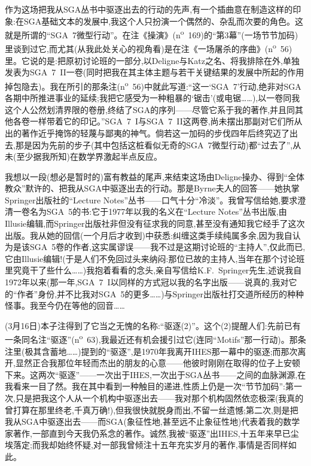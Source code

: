作为这场把我从SGA丛书中驱逐出去的行动的先声,有一个插曲意在制造这样的印象:在SGA基础文本的发展中,我这个人只扮演一个偶然的、杂乱而次要的角色。这就是所谓的“SGA~7微型行动”。在注《操演》(n\textsuperscript{o}~169)的“第3幕”(一场节节加码)里谈到过它,而尤其(从我此处关心的视角看)是在注《一场屠杀的序曲》(n\textsuperscript{o}~56)里。它说的是:把原初讨论班的一部分,以Deligne与Katz之名、将我排除在外,单独发表为SGA~7~II一卷(同时把我在其主体主题与若干关键结果的发展中所起的作用掉包隐去)。我在所引的那条注(n\textsuperscript{o}~56)中就此写道:“这一‘SGA~7’行动,绝非对SGA各期中所推进事业的延续;我把它感受为一种粗暴的‘锯击’(或电锯……),以一卷同我这个人公然划清界限的卷册,终结了SGA的序列——尽管它系于我的著作,并且同其他各卷一样带着它的印记。”SGA~7~I与SGA~7~II这两卷,尚未摆出那副对它们所从出的著作近乎掩饰的轻蔑与鄙夷的神气。倘若这一加码的步伐四年后终究迈了出去,那是因为先前的步子(其中包括这桩看似无奇的SGA~7微型行动)都“过去了”,从未(至少据我所知)在数学界激起半点反应。

我想以一段(想必是暂时的)富有教益的尾声,来结束这场由Deligne操办、得到“全体教众”默许的、把我从SGA中驱逐出去的行动。那是Byrne夫人的回答——她执掌Springer出版社的“Lecture Notes”丛书——口气十分“冷淡”。我曾写信给她,要求澄清一卷名为SGA~5的书:它于1977年以我的名义在“Lecture Notes”丛书出版,由Illusie编辑,而Springer出版社非但没有征求我的同意,甚至没有通知我它经手了这次出版。我从她的回信(一个月后才收到)中获悉:纠缠这类手续纯属多余,因为我自认为是该SGA~5卷的作者,这实属谬误——我不过是这期讨论班的“主持人”,仅此而已,它由Illusie编辑!(于是人们不免回过头来纳闷:那位已故的主持人,当年在那个讨论班里究竟干了些什么……)我抱着看看的念头,亲自写信给K.F.~Springer先生,述说我自1972年以来(那一年,SGA~7~I以同样的方式冠以我的名字出版——说真的,我对它的“作者”身份,并不比我对SGA~5的更多……)与Springer出版社打交道所经历的种种怪事。我至今仍在等他的回音……

(3月16日)本子注得到了它当之无愧的名称:“驱逐(2)”。这个(2)提醒人们:先前已有一条同名注“驱逐”(n\textsuperscript{o}~63),我最近还有机会援引过它(连同“Motifs”那一行动)。那条注里(极其含蓄地……)提到的“驱逐”,是1970年我离开IHES那一幕中的驱逐;而那次离开,显然正合我那位年轻而杰出的朋友的心意——他彼时刚刚在取得的位子上安顿下来。这两次“驱逐”——一次出于IHES,一次出于SGA丛书——之间的血脉渊源,在我看来一目了然。我在其中看到一种触目的递进,性质上仍是一次“节节加码”:第一次,只是把我这个人从一个机构中驱逐出去——我对那个机构固然依恋极深(我真的曾打算在那里终老,千真万确!),但我很快就脱身而出,不留一丝遗憾;第二次,则是把我从SGA中驱逐出去——而SGA(象征性地,甚至远不止象征性地)代表着我的数学家著作,一部直到今天我仍系念的著作。诚然,我被“驱逐”出IHES,十五年来早已尘埃落定;而我却始终怀疑,对一部我曾倾注十五年充实岁月的著作,事情是否同样如此。

